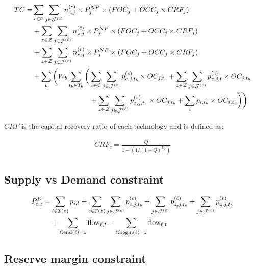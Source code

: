 \documentclass[11pt, oneside]{article}   	%
\newcommand{\flow}{\text{flow}}
\newcommand{\bc}{\bar{c}}
\begin{document}
\begin{equation} \label{eq:obj_fun}
\begin{split}
TC = &  \sum_{c \in \Cc}\sum_{j \in \Jc^{(c)}} n^{(c)}_{c, j} \times P^{NP}_{j} \times (FOC_{j} + OCC_{j} \times CRF_{j}) \\
& +  \sum_{z \in \Zc}\sum_{j \in \Jc^{(\bc)}} n^{(\bc)}_{z, j} \times P^{NP}_{j} \times (FOC_{j} + OCC_{j} \times CRF_{j}) \\
& +  \sum_{z \in \Zc}\sum_{j \in \Jc^{(r)}} n^{(r)}_{z, j} \times P^{NP}_{j} \times (FOC_{j} + OCC_{j} \times CRF_{j}) \\
& + \sum_b \bigg( W_b \sum_{t_b \in T_b}\bigg( \sum_{c \in \Cc}\sum_{j \in \Jc^{(c)}} p^{(c)}_{c, j, t_b} \times OC_{j, t_b} + \sum_{z \in \Zc}\sum_{j \in \Jc^{(\bc)}} p^{(\bc)}_{z, j, t} \times OC_{j, t_b} \\
& \qquad\qquad\qquad\qquad +  \sum_{z \in \Zc}\sum_{j \in \Jc^{(r)}} p^{(r)}_{z, j, t_b} \times OC_{j, t_b} + \sum_{i} p_{i, t_b} \times OC_{i, t_b} \bigg)\bigg)
\end{split}
\end{equation}

$CRF$ is the capital recovery ratio of each technology and is defined as:

\begin{equation} \label{eq:cap_rec}
\begin{aligned}
CRF_c = \frac{Q}{1-\left(1/(1+Q)^{D_c}\right)}
\end{aligned}
\end{equation}

\subsection{Supply vs Demand constraint}

\begin{equation} \label{eq:supply_demand}
\begin{split}
P^D_{t, z} = & \sum_{i \in \Ic(z)} p_{i, t} +  \sum_{c \in \Cc (z)}  \sum_{j \in \Jc^{(c)}} p^{(c)}_{c, j, t_b} + \sum_{j \in \Jc^{(\bc)}} p^{(\bc)}_{z, j, t_b} +  \sum_{j \in \Jc^{(r)}} p^{(r)}_{z, j, t_b} \\
& +  \sum_{\ell: \text{end}(\ell) = z} \flow_{\ell, t} - \sum_{\ell: \text{begin}(\ell) = z} \flow_{\ell, t}
\end{split}
\end{equation}

\subsection{Reserve margin constraint}
\end{document}
